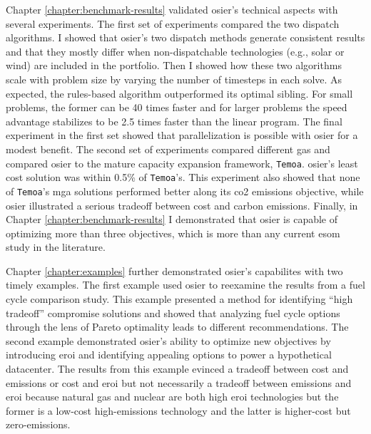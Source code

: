 Chapter \ref{chapter:benchmark-results} validated \ac{osier}'s technical
aspects with several experiments. The first set of experiments compared the two
dispatch algorithms. I showed that \ac{osier}'s two dispatch methods generate
consistent results and that they mostly differ when non-dispatchable
technologies (e.g., solar or wind) are included in the portfolio. Then I showed
how these two algorithms scale with problem size by varying the number of
timesteps in each solve. As expected, the rules-based algorithm outperformed its
optimal sibling. For small problems, the former can be 40 times faster and for
larger problems the speed advantage stabilizes to be 2.5 times faster than the
linear program. The final experiment in the first set showed that
parallelization is possible with \ac{osier} for a modest benefit. The second set
of experiments compared different \acp{ga} and compared \ac{osier} to the mature
capacity expansion framework, \texttt{Temoa}. \ac{osier}'s least cost solution
was within 0.5\% of \texttt{Temoa}'s. This experiment also showed that none of
\texttt{Temoa}'s \ac{mga} solutions performed better along its \ac{co2}
emissions objective, while \ac{osier} illustrated a serious tradeoff between
cost and carbon emissions. Finally, in Chapter \ref{chapter:benchmark-results} I
demonstrated that \ac{osier} is capable of optimizing more than three
objectives, which is more than any current \ac{esom} study in the literature.

Chapter \ref{chapter:examples} further demonstrated \ac{osier}'s capabilites
with two timely examples. The first example used \ac{osier} to reexamine the
results from a fuel cycle comparison study. This example presented a method for
identifying ``high tradeoff'' compromise solutions and showed that analyzing
fuel cycle options through the lens of Pareto optimality leads to different
recommendations. The second example demonstrated \ac{osier}'s ability to
optimize new objectives by introducing \acf{eroi} and identifying appealing
options to power a hypothetical datacenter. The results from this example
evinced a tradeoff between cost and emissions or cost and \ac{eroi} but not
necessarily a tradeoff between emissions and \ac{eroi} because natural gas and
nuclear are both high \ac{eroi} technologies but the former is a low-cost
high-emissions technology and the latter is higher-cost but zero-emissions.


